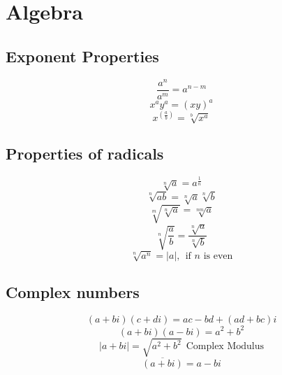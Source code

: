 \documentclass{article}
\begin{document}
\section{Algebra}
	\subsection{Exponent Properties}
		\begin{equation}
			\frac{a^n}{a^m} = a^{n-m}
		\end{equation}
		\begin{equation}
			x^a y^a = \left( {xy} \right)^a
		\end{equation}
		\begin{equation}
			x^{\left( {\frac{a}{b}} \right)} = \sqrt[b]{{x^a }}
		\end{equation}
	\subsection{Properties of radicals}
		\begin{equation}
			\sqrt[n]{a} = a^{\frac{1}{n}}
		\end{equation}
		\begin{equation}
			\sqrt[n]{ab} = \sqrt[n]{a}\sqrt[n]{b}
		\end{equation}
		\begin{equation}
			\sqrt[m]{\sqrt[n]{a}} = \sqrt[nm]{a}
		\end{equation}
		\begin{equation}
			\sqrt[n]{\frac{a}{b}} = \frac{\sqrt[n]{a}}{\sqrt[n]{b}}
		\end{equation}
		\begin{equation}
			\sqrt[n]{a^n} = |a|, \ \ \mbox{if $n$ is even}
		\end{equation}
	\subsection{Complex numbers}
		\begin{equation}
			(a+bi)(c+di) =  ac-bd+(ad+bc)i
		\end{equation}
		\begin{equation}
			(a+bi)(a-bi) =  a^2 + b^2
		\end{equation}
		\begin{equation}
			|a + bi| = \sqrt{a^2+b^2} \ \ \mbox{Complex Modulus}
		\end{equation}
		\begin{equation}
			\overline{(a+bi)}=a-bi
		\end{equation}
\end{document}
